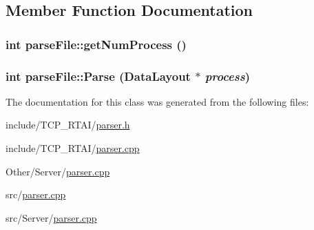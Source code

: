 \subsection{Member Function Documentation}
\hypertarget{classparseFile_a0beaa689666f13d6abbd6a3957e62061}{
\subsubsection[{getNumProcess}]{\setlength{\rightskip}{0pt plus 5cm}int parseFile::getNumProcess ()}}
\label{classparseFile_a0beaa689666f13d6abbd6a3957e62061}
\hypertarget{classparseFile_acec3556d26009bf290b04b634d69c464}{
\subsubsection[{Parse}]{\setlength{\rightskip}{0pt plus 5cm}int parseFile::Parse ({\bf DataLayout} $\ast$ {\em process})}}
\label{classparseFile_acec3556d26009bf290b04b634d69c464}


The documentation for this class was generated from the following files:\begin{DoxyCompactItemize}
\item 
include/TCP\_\-RTAI/\hyperlink{parser_8h}{parser.h}\item 
include/TCP\_\-RTAI/\hyperlink{include_2TCP__RTAI_2parser_8cpp}{parser.cpp}\item 
Other/Server/\hyperlink{Other_2Server_2parser_8cpp}{parser.cpp}\item 
src/\hyperlink{src_2parser_8cpp}{parser.cpp}\item 
src/Server/\hyperlink{src_2Server_2parser_8cpp}{parser.cpp}\end{DoxyCompactItemize}
